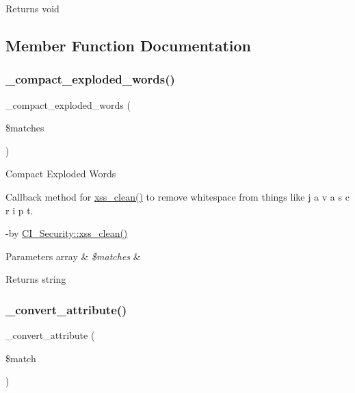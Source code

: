 \begin{DoxyReturn}{Returns}
void 
\end{DoxyReturn}


\subsection{Member Function Documentation}
\mbox{\label{class_c_i___security_adfb0e251ae35ae40303a302d253c3ab2}} 
\subsubsection{\texorpdfstring{\+\_\+compact\+\_\+exploded\+\_\+words()}{\_compact\_exploded\_words()}}
{\footnotesize\ttfamily \+\_\+compact\+\_\+exploded\+\_\+words (\begin{DoxyParamCaption}\item[{}]{\$matches }\end{DoxyParamCaption})\hspace{0.3cm}{\ttfamily [protected]}}

Compact Exploded Words

Callback method for \mbox{\hyperlink{class_c_i___security_acb759426dbab128d3d8164805225381c}{xss\+\_\+clean()}} to remove whitespace from things like \textquotesingle{}j a v a s c r i p t\textquotesingle{}.

-\/by \mbox{\hyperlink{class_c_i___security_acb759426dbab128d3d8164805225381c}{C\+I\+\_\+\+Security\+::xss\+\_\+clean()}} 
\begin{DoxyParams}[1]{Parameters}
array & {\em \$matches} & \\
\hline
\end{DoxyParams}
\begin{DoxyReturn}{Returns}
string 
\end{DoxyReturn}
\mbox{\label{class_c_i___security_ae16451bcdc769285c499cbf8068b3523}} 
\subsubsection{\texorpdfstring{\+\_\+convert\+\_\+attribute()}{\_convert\_attribute()}}
{\footnotesize\ttfamily \+\_\+convert\+\_\+attribute (\begin{DoxyParamCaption}\item[{}]{\$match }\end{DoxyParamCaption})\hspace{0.3cm}{\ttfamily [protected]}}

